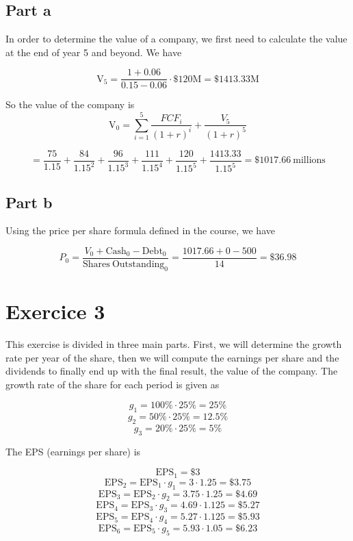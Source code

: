\documentclass[a4paper,11pt,twoside]{article}
\def \be {\begin{equation}}
\def \ee {\end{equation}}
\begin{document}
\subsection*{Part a}
In order to determine the value of a company, we first need to calculate the value at the end of year 5 and beyond. We have

\be
\mathrm{V_5}=\frac{\mathrm{1+0.06}}{0.15 - 0.06} \cdot \$120 \mathrm{M} = \$ 1413.33\mathrm{M}
\ee

So the value of the company is
\be
\mathrm{V_0}=\sum\limits_{i=1}^5 \frac{FCF_i}{(1+r)^{i}} + \frac{V_5}{(1+r)^5} 
\ee

\be
=\frac{75}{1.15} + \frac{84}{1.15^2} + \frac{96}{1.15^3} + \frac{111}{1.15^4} + \frac{120}{1.15^5} + \frac{1413.33}{1.15^5} = \$ 1017.66 \mathrm{\ millions}
\ee


\subsection*{Part b}

Using the price per share formula defined in the course, we have

\be
P_0 = \frac{V_0 + \mathrm{Cash}_0 - \mathrm{Debt}_0}{ \mathrm{Shares\ Outstanding}_0} = \frac{1017.66 + 0 - 500}{14} = \$ 36.98
\ee

\section*{Exercice 3}

This exercise is divided in three main parts. First, we will determine the growth rate per year of the share, then we will compute the earnings per share and the dividends to finally end up with the final result, the value of the company. The growth rate of the share for each period is given as

\be
g_1=100\%\cdot 25\%=25\%
\ee
\be
g_2=50\%\cdot 25\%=12.5\%
\ee
\be
g_3=20\%\cdot 25\%=5\%
\ee

The EPS (earnings per share) is

\be
\mathrm{EPS_1} = \$ 3
\ee
\be
\mathrm{EPS_2} = \mathrm{EPS_1} \cdot g_1 = 3 \cdot 1.25 = \$ 3.75
\ee
\be
\mathrm{EPS_3} = \mathrm{EPS_2} \cdot g_2 = 3.75 \cdot 1.25 = \$ 4.69
\ee
\be
\mathrm{EPS_4} = \mathrm{EPS_3} \cdot g_3 = 4.69 \cdot 1.125 = \$ 5.27
\ee
\be
\mathrm{EPS_5} = \mathrm{EPS_4} \cdot g_4 = 5.27 \cdot 1.125 = \$ 5.93
\ee
\be
\mathrm{EPS_6} = \mathrm{EPS_5} \cdot g_5 = 5.93 \cdot 1.05 = \$ 6.23
\ee
\end{document}
